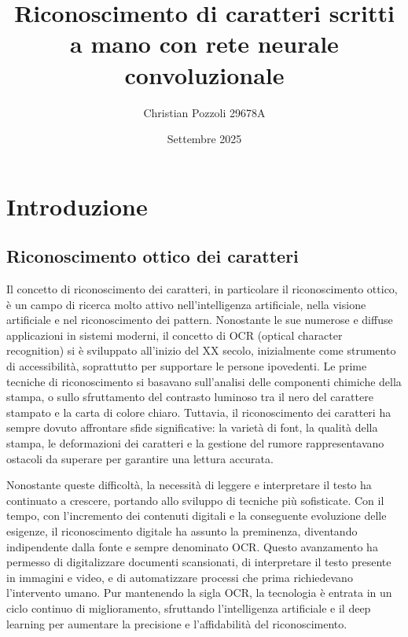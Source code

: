 \documentclass[a4paper,12pt]{article}
\title{Riconoscimento di caratteri scritti a mano con rete neurale convoluzionale}
\author{Christian Pozzoli 29678A}
\date{Settembre 2025}
\begin{document}
\maketitle
\renewcommand*\contentsname{Indice}
\tableofcontents
\newpage

\section{Introduzione}
\subsection{Riconoscimento ottico dei caratteri}
Il concetto di riconoscimento dei caratteri, in particolare il riconoscimento ottico, è un campo di ricerca molto attivo nell'intelligenza artificiale, nella visione artificiale e nel riconoscimento dei pattern. Nonostante le sue numerose e diffuse applicazioni in sistemi moderni, il concetto di OCR (optical character recognition) si è sviluppato all'inizio del XX secolo, inizialmente come strumento di accessibilità, soprattutto per supportare le persone ipovedenti. Le prime tecniche di riconoscimento si basavano sull'analisi delle componenti chimiche della stampa, o sullo sfruttamento del contrasto luminoso tra il nero del carattere stampato e la carta di colore chiaro. Tuttavia, il riconoscimento dei caratteri ha sempre dovuto affrontare sfide significative: la varietà di font, la qualità della stampa, le deformazioni dei caratteri e la gestione del rumore rappresentavano ostacoli da superare per garantire una lettura accurata.

Nonostante queste difficoltà, la necessità di leggere e interpretare il testo ha continuato a crescere, portando allo sviluppo di tecniche più sofisticate. Con il tempo, con l'incremento dei contenuti digitali e la conseguente evoluzione delle esigenze, il riconoscimento digitale ha assunto la preminenza, diventando indipendente dalla fonte e sempre denominato OCR. Questo avanzamento ha permesso di digitalizzare documenti scansionati, di interpretare il testo presente in immagini e video, e di automatizzare processi che prima richiedevano l'intervento umano. Pur mantenendo la sigla OCR, la tecnologia è entrata in un ciclo continuo di miglioramento, sfruttando l'intelligenza artificiale e il deep learning per aumentare la precisione e l'affidabilità del riconoscimento.
\end{document}
